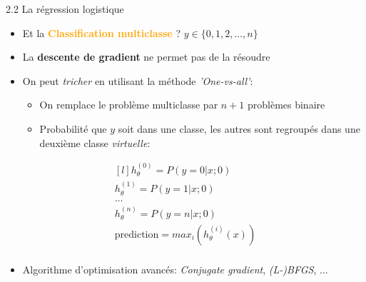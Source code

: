 \begin{frame}{2.2 La régression logistique}
  \begin{itemize}
  \item Et la \textcolor{orange}{\textbf{Classification multiclasse}} ? $y \in \{0,1,2,\dots,n\}$
  \item La \textbf{descente de gradient} ne permet pas de la résoudre
  \item On peut \textit{tricher} en utilisant la méthode \textit{'One-vs-all'}:
    \begin{itemize}
    \item On remplace le problème multiclasse par $n+1$ problèmes binaire
    \item Probabilité que $y$ soit dans une classe, les autres sont regroupés dans une deuxième classe \textit{virtuelle}:
    \end{itemize}
  \end{itemize}
  \begin{equation*}
    \begin{matrix*}[l]
      h_{\theta}^{(0)} = P(y=0 | x;0)\\
      h_{\theta}^{(1)} = P(y=1 | x;0)\\
      \dots \\
      h_{\theta}^{(n)} = P(y=n | x;0)\\
      \text{prediction} = max_{i}(h_{\theta}^{(i)}(x))\\
    \end{matrix*}
  \end{equation*}
  \begin{itemize}
  \item Algorithme d'optimisation avancés: \textit{Conjugate gradient}, \textit{(L-)BFGS}, $\dots$
  \end{itemize}
\end{frame}

